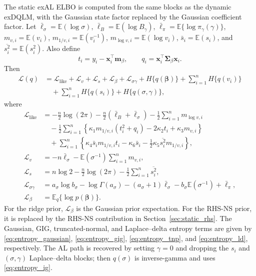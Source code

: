 \documentclass[nojss,noheadings]{jss}
\renewcommand{\E}{\mathbb{E}}
\newcommand{\vect}[1]{\bm{#1}}
\newcommand{\mat}[1]{\mathbf{#1}}
\newcommand{\elbo}{\mathcal{L}}
\newcommand{\pigamma}{\pi_\gamma}
\begin{document}
The static exAL ELBO is computed from the same blocks as the dynamic exDQLM,
with the Gaussian state factor replaced by the Gaussian coefficient factor.
Let
$\bar\ell_\sigma=\E(\log\sigma)$,
$\bar\ell_B=\E(\log B_\gamma)$,
$\bar\ell_\pi=\E\{\log\pigamma(\gamma)\}$,
$m_{v,i}=\E(v_i)$, $m_{1/v,i}=\E(v_i^{-1})$,
$m_{\log v,i}=\E(\log v_i)$, $\bar s_i=\E(s_i)$, and
$\overline{s_i^2}=\E(s_i^2)$. Also define
\begin{equation}
t_i=y_i-\vect{x}_i^\top\vect{m}_\beta,\qquad
q_i=\vect{x}_i^\top\mat{\Sigma}_\beta\vect{x}_i.
\end{equation}
Then
\begin{align}
\elbo(q)
&=
\elbo_{\mathrm{like}}+\elbo_v+\elbo_s+\elbo_\beta
+\elbo_{\sigma\gamma}
+H\{q(\vect{\beta})\}
+\sum_{i=1}^nH\{q(v_i)\}\nonumber\\
&\quad
+\sum_{i=1}^nH\{q(s_i)\}
+H\{q(\sigma,\gamma)\},
\label{eq:static_exal_elbo}
\end{align}
where
\begin{align}
\elbo_{\mathrm{like}}
&=
-\frac{n}{2}\log(2\pi)
-\frac{n}{2}(\bar\ell_B+\bar\ell_\sigma)
-\frac{1}{2}\sum_{i=1}^nm_{\log v,i}\nonumber\\
&\quad
-\frac{1}{2}\sum_{i=1}^n
\left\{
\kappa_1m_{1/v,i}(t_i^2+q_i)
-2\kappa_2t_i+\kappa_3m_{v,i}
\right\}\nonumber\\
&\quad
+\sum_{i=1}^n
\left\{
\kappa_4\bar s_i m_{1/v,i}t_i
-\kappa_6\bar s_i
-\frac{1}{2}\kappa_5\overline{s_i^2}m_{1/v,i}
\right\},\\
\elbo_v
&=
-n\bar\ell_\sigma-\E(\sigma^{-1})\sum_{i=1}^nm_{v,i},\\
\elbo_s
&=
n\log 2-\frac{n}{2}\log(2\pi)
-\frac{1}{2}\sum_{i=1}^n\overline{s_i^2},\\
\elbo_{\sigma\gamma}
&=
a_\sigma\log b_\sigma-\log\Gamma(a_\sigma)
-(a_\sigma+1)\bar\ell_\sigma
-b_\sigma\E(\sigma^{-1})
+\bar\ell_\pi,\\
\elbo_\beta
&=\E_q\{\log p(\vect{\beta})\}.
\label{eq:static_exal_elbo_terms}
\end{align}
For the ridge prior, $\elbo_\beta$ is the Gaussian prior expectation. For the
RHS-NS prior, it is replaced by the RHS-NS contribution in
Section~\ref{sec:static_rhs}. The Gaussian, GIG, truncated-normal, and
Laplace--delta entropy terms are given by
\eqref{eq:entropy_gaussian}, \eqref{eq:entropy_gig},
\eqref{eq:entropy_tnp}, and \eqref{eq:entropy_ld}, respectively. The AL path
is recovered by setting $\gamma=0$ and dropping the $s_i$ and
$(\sigma,\gamma)$ Laplace--delta blocks; then $q(\sigma)$ is inverse-gamma and
uses \eqref{eq:entropy_ig}.
\end{document}
